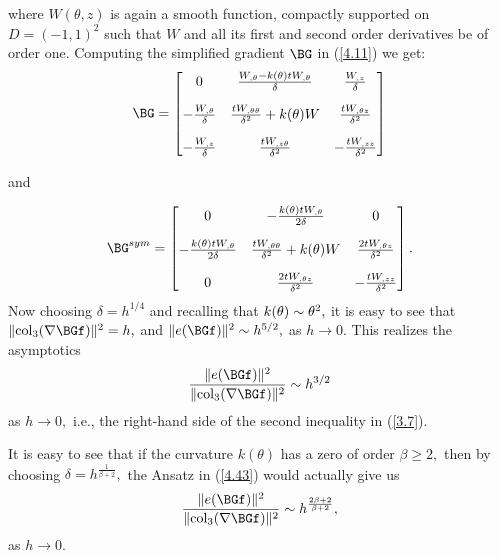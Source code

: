 where $W(\theta,z)$ is again a smooth function, compactly supported on $D=(-1,1)^2$ such that $W$ and all its first and second order derivatives be of order one. 
Computing the simplified gradient $\BG$ in (\ref{4.11}) we get:
\begin{align*}
\BG=\begin{bmatrix} 
0     &     \frac{W_{,\theta}-k(\theta)tW_{,\theta}}{\delta }    &     \frac{W_{,z}}{\delta} \\[10pt]
-\frac{W_{,\theta}}{\delta}    &    \frac{tW_{,\theta\theta}}{\delta^2}+k(\theta)W      &      \frac{tW_{,\theta z}}{\delta^2}\\[10pt]
-\frac{W_{,z}}{\delta}    &     \frac{tW_{,z\theta}}{\delta^2}   &     -\frac{tW_{,zz}}{\delta^2}
\end{bmatrix}	
\end{align*}

and

$$
\BG^{sym}=\begin{bmatrix} 
0    &    -\frac{k(\theta)tW_{,\theta}}{2\delta}    &     0 \\[10pt]
-\frac{k(\theta)tW_{,\theta}}{2\delta}    &    \frac{tW_{,\theta\theta}}{\delta^2}+k(\theta)W  &   \frac{2tW_{,\theta z}}{\delta^2} \\[10pt]
0    &    \frac{2tW_{,\theta z}}{\delta^2}    &    -\frac{tW_{,zz}}{\delta^2}
\end{bmatrix}.
$$
Now choosing $\delta=h^{1/4}$ and recalling that $k(\theta)\sim\theta^2,$ it is easy to see that $\|\mathrm{col}_3(\nabla\BGf)\|^2=h,$ 
and $\|e(\BGf)\|^2\sim h^{5/2},$ as $h\to 0.$ This realizes the asymptotics 
$$\frac{\|e(\BGf)\|^2}{\|\mathrm{col}_3(\nabla\BGf)\|^2}\sim h^{3/2}$$ 
as $h\to 0,$ i.e., the right-hand side of the second inequality in (\ref{3.7}). 

\begin{remark}
\label{rem:4.2}
It is easy to see that if the curvature $k(\theta)$ has a zero of order $\beta\geq 2,$ then by choosing $\delta=h^{\frac{1}{\beta+2}},$ the Ansatz in (\ref{4.43}) would actually give us $$\frac{\|e(\BGf)\|^2}{\|\mathrm{col}_3(\nabla\BGf)\|^2}\sim h^{\frac{2\beta+2}{\beta+2}},$$
as $h\to 0.$
\end{remark}



